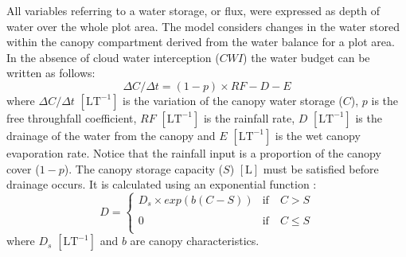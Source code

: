 \documentclass[a4paper,12pt]{article}
\begin{document}
\begin{linenumbers}
All variables referring to a water storage, or flux, were expressed as depth of water over the whole plot area.
The model considers changes in the water stored within the canopy compartment derived from the water balance for a plot area. In the absence of cloud water interception ($CWI$) the water budget can be written as follows:
\begin{equation} \label{eq:fog_can_bal}
    \Delta C/\Delta t = (1 - p) \times RF - D - E 
\end{equation}
where $\Delta C/\Delta t$ $\mathrm{[LT^{-1}]}$ is the variation of the canopy water storage ($C$), $p$ is the free throughfall coefficient, $RF$ $\mathrm{[LT^{-1}]}$ is the rainfall rate, $D$ $\mathrm{[LT^{-1}]}$ is the drainage of the water from the canopy and $E$ $\mathrm{[LT^{-1}]}$ is the wet canopy evaporation rate. Notice that the rainfall input is a proportion of the canopy cover ($1-p$). The canopy storage capacity ($S$) $\mathrm{[L]}$ must be satisfied before drainage occurs. It is calculated using an exponential function \citep{GashandMorton1978, Valenteetal1997, Pryetetal2012a}:
\begin{equation} \label{eq:fog_drainage}
D=%
  \begin{cases}
    D_s \times exp(b(C - S)) &  \mathrm{if} \quad C > S \\
    \\
    0 & \mathrm{if} \quad C \leq S \\
  \end{cases}
\end{equation}
where $D_s$ $\mathrm{[LT^{-1}]}$ and $b$ are canopy characteristics.


\end{linenumbers}
\end{document}
